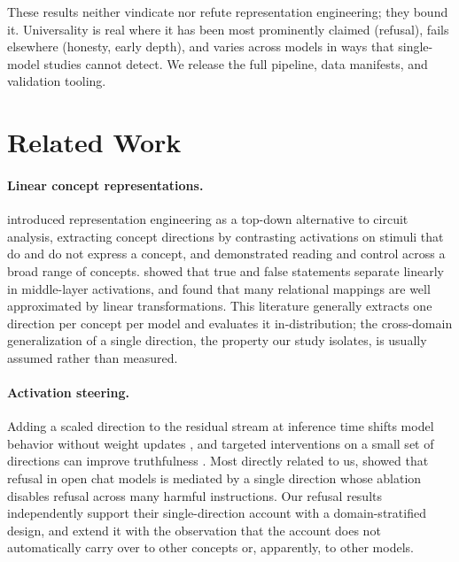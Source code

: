\documentclass[11pt]{article}
\begin{document}
These results neither vindicate nor refute representation engineering; they
bound it. Universality is real where it has been most prominently claimed
(refusal), fails elsewhere (honesty, early depth), and varies across models
in ways that single-model studies cannot detect. We release the full
pipeline, data manifests, and validation tooling.


\section{Related Work}
\label{sec:related}

\paragraph{Linear concept representations.}
\citet{zou2023representation} introduced representation engineering as a
top-down alternative to circuit analysis, extracting concept directions by
contrasting activations on stimuli that do and do not express a concept, and
demonstrated reading and control across a broad range of concepts.
\citet{marks2023geometry} showed that true and false statements separate
linearly in middle-layer activations, and \citet{hernandez2023linearity}
found that many relational mappings are well approximated by linear
transformations. This literature generally extracts one direction per
concept per model and evaluates it in-distribution; the cross-domain
generalization of a single direction, the property our study isolates, is
usually assumed rather than measured.

\paragraph{Activation steering.}
Adding a scaled direction to the residual stream at inference time shifts
model behavior without weight updates \citep{turner2023activation}, and
targeted interventions on a small set of directions can improve truthfulness
\citep{li2024inference}. Most directly related to us,
\citet{arditi2024refusal} showed that refusal in open chat models is
mediated by a single direction whose ablation disables refusal across many
harmful instructions. Our refusal results independently support their
single-direction account with a domain-stratified design, and extend it with
the observation that the account does not automatically carry over to other
concepts or, apparently, to other models.
\end{document}
